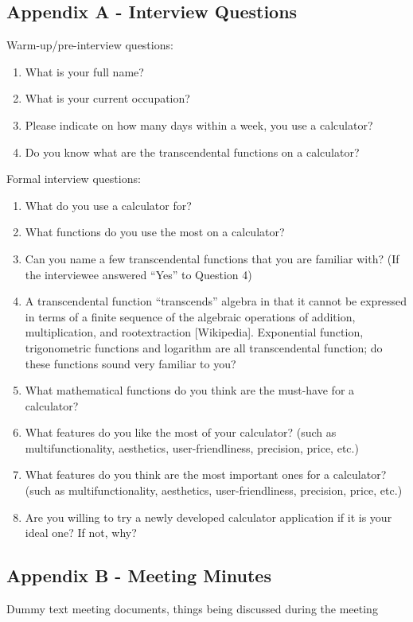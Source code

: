 \documentclass[12pt]{article}
\begin{document}
\subsection{Appendix A - Interview Questions}
Warm-up/pre-interview questions:
\begin{enumerate}
\item What is your full name?
\item What is your current occupation?
\item Please indicate on how many days within a week, you use a calculator?
\item Do you know what are the transcendental functions on a calculator?
\end{enumerate}
Formal interview questions:
\begin{enumerate}
\item What do you use a calculator for?
\item What functions do you use the most on a calculator?
\item Can you name a few transcendental functions that you are familiar with?\newline
      (If the interviewee answered “Yes” to Question 4)
\item A transcendental function “transcends” algebra in that it cannot be expressed in terms\newline
      of a finite sequence of the algebraic operations of addition, multiplication, and root\newline extraction [Wikipedia]. Exponential function, trigonometric functions and logarithm are all transcendental function; do these functions sound very familiar to you?
\item What mathematical functions do you think are the must-have for a calculator?
\item What features do you like the most of your calculator?\newline
      (such as multifunctionality, aesthetics, user-friendliness, precision, price, etc.)
\item What features do you think are the most important ones for a calculator?\newline
      (such as multifunctionality, aesthetics, user-friendliness, precision, price, etc.)

\item Are you willing to try a newly developed calculator application if it is your ideal one?\newlineIf
      If not, why?
\end{enumerate}

\subsection{Appendix B - Meeting Minutes}
Dummy text
meeting documents, things being discussed during the meeting



\end{document}
